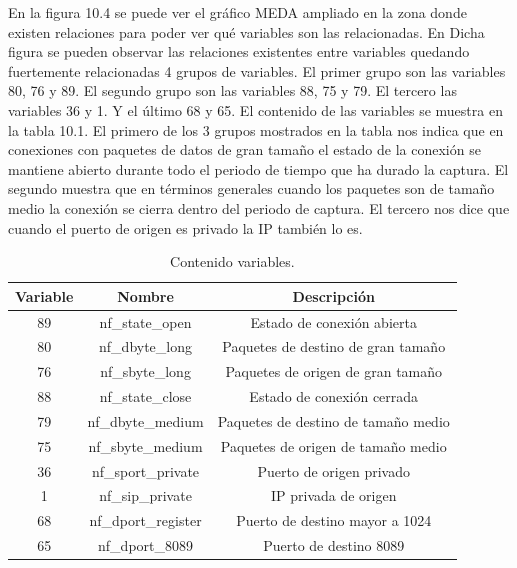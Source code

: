 \bigskip

En la figura 10.4 se puede ver el gráfico MEDA ampliado en la zona donde existen relaciones para poder ver qué variables son las relacionadas. En Dicha figura se pueden observar las relaciones existentes entre variables quedando fuertemente relacionadas 4 grupos de variables. El primer grupo son las variables 80, 76 y 89. El segundo grupo son las variables 88, 75 y 79. El tercero las variables 36 y 1. Y el último 68 y 65. El contenido de las variables se muestra en la tabla 10.1. El primero de los 3 grupos mostrados en la tabla nos indica que en conexiones con paquetes de datos de gran tamaño el estado de la conexión se mantiene abierto durante todo el periodo de tiempo que ha durado la captura. El segundo muestra que en términos generales cuando los paquetes son de tamaño medio la conexión se cierra dentro del periodo de captura. El tercero nos dice que cuando el puerto de origen es privado la IP también lo es.

\begin{table}[H]
\begin{center}
\begin{tabular}{|c|c|c|}
\hline
\textbf{Variable} &\textbf{Nombre} & \textbf{Descripción} \\
 \hline \hline

89 & nf\_state\_open & Estado de conexión abierta	\\ \hline
80 & nf\_dbyte\_long & Paquetes de destino de gran tamaño \\ \hline
76 & nf\_sbyte\_long & Paquetes de origen de gran tamaño  \\	
\hline \hline

88 & nf\_state\_close & Estado de conexión cerrada	\\ \hline
79 & nf\_dbyte\_medium & Paquetes de destino de tamaño medio	\\ \hline
75 & nf\_sbyte\_medium & Paquetes de origen de tamaño medio\\
 \hline \hline

36 & nf\_sport\_private & Puerto de origen privado\\ \hline
1 & nf\_sip\_private & IP privada de origen	\\
\hline \hline

68 & nf\_dport\_register & Puerto de destino mayor a 1024\\ \hline 
65 & nf\_dport\_8089 & Puerto de destino 8089 \\ \hline 
\end{tabular}
\caption{Contenido variables.}
\end{center}
\end{table}

